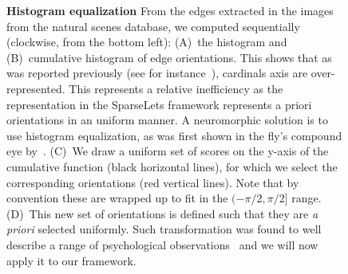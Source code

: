 \documentclass[a4paper, 11pt]{book}
\begin{document}
\begin{figure}[ht!]%
\caption{ {\bf Histogram equalization} From the edges extracted in the images from the natural scenes database, we computed sequentially (clockwise, from the bottom left): \textsf{(A)}~the histogram  and \textsf{(B)}~cumulative histogram of edge orientations. This shows that as was reported previously (see for instance~\citep{Girshick11}), cardinals axis are over-represented. This represents a relative inefficiency as the representation in the SparseLets framework represents a priori orientations in an uniform manner. A neuromorphic solution is to use histogram equalization, as was first shown in the fly's compound eye by~\citep{Laughlin81}. \textsf{(C)}~We draw a uniform set of scores on the y-axis of the cumulative function (black horizontal lines), for which we select the corresponding orientations (red vertical lines). Note that by convention these are wrapped up to fit in the $( -\pi/2, \pi/2]$ range. \textsf{(D)}~This new set of orientations is defined such that they are \emph{a priori} selected uniformly. Such transformation was found to well describe a range of psychological observations~\citep{Ganguli10} and we will now apply it to our framework.
\label{fig:laughlin}}%
\end{figure}%
\end{document}
